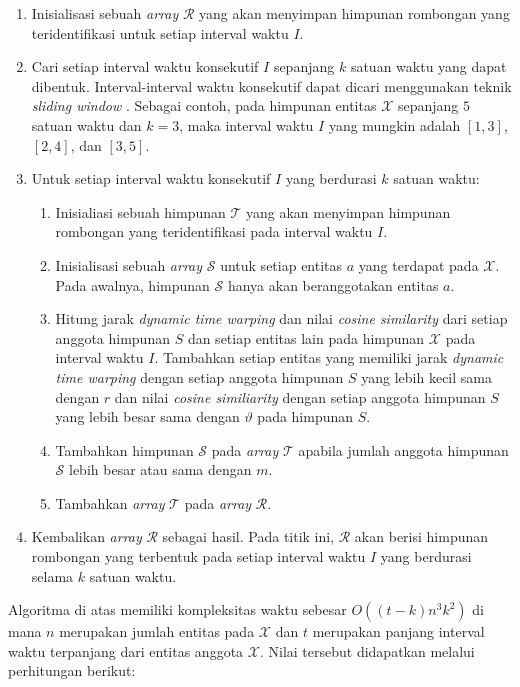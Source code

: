 \begin{enumerate}
    \item Inisialisasi sebuah \textit{array} $\mathcal{R}$ yang akan menyimpan himpunan rombongan yang teridentifikasi untuk setiap interval waktu $I$.
    \item Cari setiap interval waktu konsekutif $I$ sepanjang $k$ satuan waktu yang dapat dibentuk. Interval-interval waktu konsekutif dapat dicari menggunakan teknik \textit{sliding window} \cite{ralf:03:sliding-window}. Sebagai contoh, pada himpunan entitas $\mathcal{X}$ sepanjang $5$ satuan waktu dan $k = 3$, maka interval waktu $I$ yang mungkin adalah $[1, 3]$, $[2, 4]$, dan $[3, 5]$.
    \item Untuk setiap interval waktu konsekutif $I$ yang berdurasi $k$ satuan waktu:
    
    \begin{enumerate}
        \item Inisialiasi sebuah himpunan $\mathcal{T}$ yang akan menyimpan himpunan rombongan yang teridentifikasi pada interval waktu $I$.  
        \item Inisialisasi sebuah \textit{array} $\mathcal{S}$ untuk setiap entitas $a$ yang terdapat pada $\mathcal{X}$. Pada awalnya, himpunan $\mathcal{S}$ hanya akan beranggotakan entitas $a$.
        \item Hitung jarak \textit{dynamic time warping} dan nilai \textit{cosine similarity} dari setiap anggota himpunan $S$ dan setiap entitas lain pada himpunan $\mathcal{X}$ pada interval waktu $I$. Tambahkan setiap entitas yang memiliki jarak \textit{dynamic time warping} dengan setiap anggota himpunan $S$ yang lebih kecil sama dengan $r$ dan nilai \textit{cosine similiarity} dengan setiap anggota himpunan $S$ yang lebih besar sama dengan $\vartheta$ pada himpunan $S$.
        \item Tambahkan himpunan $\mathcal{S}$ pada \textit{array} $\mathcal{T}$ apabila jumlah anggota himpunan $\mathcal{S}$ lebih besar atau sama dengan $m$.
        \item Tambahkan \textit{array} $\mathcal{T}$ pada \textit{array} $\mathcal{R}$.
    \end{enumerate}
    \item Kembalikan \textit{array} $\mathcal{R}$ sebagai hasil. Pada titik ini, $\mathcal{R}$ akan berisi himpunan rombongan yang terbentuk pada setiap interval waktu $I$ yang berdurasi selama $k$ satuan waktu.
\end{enumerate}

Algoritma di atas memiliki kompleksitas waktu sebesar $O((t - k)n^3k^2)$ di mana $n$ merupakan jumlah entitas pada $\mathcal{X}$ dan $t$ merupakan panjang interval waktu terpanjang dari entitas anggota $\mathcal{X}$. Nilai tersebut didapatkan melalui perhitungan berikut:

